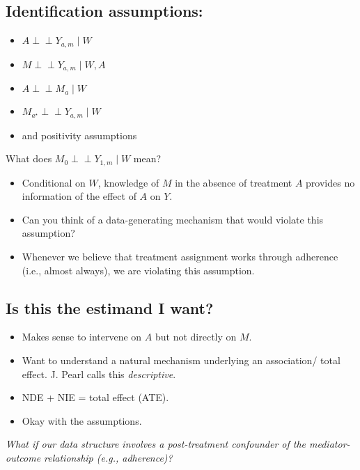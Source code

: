 \documentclass[
  12pt, krantz2,
]{book}
\providecommand{\tightlist}{%
  \setlength{\itemsep}{0pt}\setlength{\parskip}{0pt}}
\theoremstyle{definition}
\theoremstyle{definition}
\theoremstyle{definition}
\newcommand{\indep}{\mbox{$\perp\!\!\!\perp$}}
\newcommand{\1}{\mathbbm{1}}
\begin{document}
\hypertarget{identification-assumptions}{%
\subsection{Identification assumptions:}\label{identification-assumptions}}

\begin{itemize}
\tightlist
\item
  \(A \indep Y_{a,m} \mid W\)
\item
  \(M \indep Y_{a,m} \mid W, A\)
\item
  \(A \indep M_a \mid W\)
\item
  \(M_{a^{\star}} \indep Y_{a,m} \mid W\)
\item
  and positivity assumptions
\end{itemize}

What does \(M_0 \indep Y_{1,m} \mid W\) mean?

\begin{itemize}
\tightlist
\item
  Conditional on \(W\), knowledge of \(M\) in the absence of treatment \(A\)
  provides no information of the effect of \(A\) on \(Y\).
\item
  Can you think of a data-generating mechanism that would violate this
  assumption?
\item
  Whenever we believe that treatment assignment works through adherence (i.e.,
  almost always), we are violating this assumption.
\end{itemize}

\hypertarget{is-this-the-estimand-i-want-1}{%
\subsection{Is this the estimand I want?}\label{is-this-the-estimand-i-want-1}}

\begin{itemize}
\tightlist
\item
  Makes sense to intervene on \(A\) but not directly on \(M\).
\item
  Want to understand a natural mechanism underlying an association/ total
  effect. J. Pearl calls this \emph{descriptive}.
\item
  NDE + NIE = total effect (ATE).
\item
  Okay with the assumptions.
\end{itemize}

\emph{What if our data structure involves a post-treatment confounder of the
mediator-outcome relationship (e.g., adherence)?}
\end{document}
